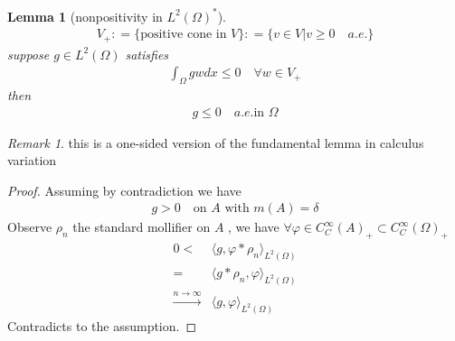 \documentclass[a4paper,12pt,oneside,fleqn]{book}
\newtheorem{lemma}[theorem]{Lemma}
\theoremstyle{definition}
\theoremstyle{remark}
\newtheorem*{remark}{Remark}
\begin{document}
\begin{lemma}[nonpositivity in $L^2(\Omega)^*$]
	\begin{align*}
		V_+: =\{ \text{positive cone in }  V\}: = \{ v \in V| v \ge 0 \quad a.e.\}
	\end{align*}
	suppose $g \in L^2(\Omega)$ satisfies 
	\begin{align*}
		\int_\Omega g w dx \le 0 \quad \forall w \in V_+
	\end{align*}
	then 
	\begin{align*}
		g \le 0 \quad a.e. \text{in } \Omega
	\end{align*}
\end{lemma}
\begin{remark}
this is a one-sided version of the fundamental lemma in calculus variation	
\end{remark}
\begin{proof}
	Assuming by contradiction we have 
	\begin{align*}
		g > 0 \quad \text{on $A$} \text{ with } m(A) = \delta
	\end{align*}
	Observe $\rho_n$ the standard mollifier on $A$ , we have $\forall \varphi \in C^\infty_C(A)_+ \subset C^\infty_C(\Omega)_+$
	\begin{align*}
		0<&\langle g, \varphi *\rho_n \rangle_{L^2(\Omega)} \\
	   =&\langle g *\rho_n , \varphi \rangle_{L^2(\Omega)} \\
	   \overset{n \rightarrow \infty}{\rightarrow} &
	   \langle g, \varphi\rangle_{L^2(\Omega)} 
	\end{align*}
	Contradicts to the assumption. 
\end{proof}
\end{document}
